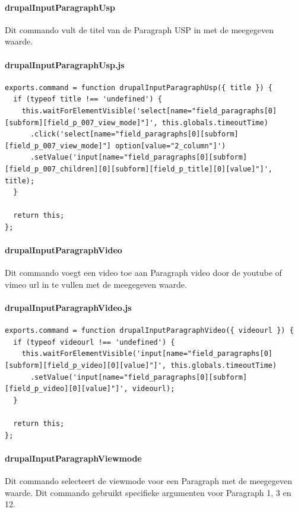 \clearpage
\paragraph{drupalInputParagraphUsp}
\label{commando24}
Dit commando vult de titel van de Paragraph USP in met de meegegeven waarde.
\paragraph{drupalInputParagraphUsp.js}
\begin{lstlisting}[breaklines=true]
exports.command = function drupalInputParagraphUsp({ title }) {
  if (typeof title !== 'undefined') {
    this.waitForElementVisible('select[name="field_paragraphs[0][subform][field_p_007_view_mode]"]', this.globals.timeoutTime)
      .click('select[name="field_paragraphs[0][subform][field_p_007_view_mode]"] option[value="2_column"]')
      .setValue('input[name="field_paragraphs[0][subform][field_p_007_children][0][subform][field_p_title][0][value]"]', title);
  }

  return this;
};
\end{lstlisting}


\clearpage
\paragraph{drupalInputParagraphVideo}
\label{commando25}
Dit commando voegt een video toe aan Paragraph video door de youtube of vimeo url in te vullen met de meegegeven waarde.
\paragraph{drupalInputParagraphVideo.js}
\begin{lstlisting}[breaklines=true]
exports.command = function drupalInputParagraphVideo({ videourl }) {
  if (typeof videourl !== 'undefined') {
    this.waitForElementVisible('input[name="field_paragraphs[0][subform][field_p_video][0][value]"]', this.globals.timeoutTime)
      .setValue('input[name="field_paragraphs[0][subform][field_p_video][0][value]"]', videourl);
  }

  return this;
};
\end{lstlisting}


\clearpage
\paragraph{drupalInputParagraphViewmode}
\label{commando26}
Dit commando selecteert de viewmode voor een Paragraph met de meegegeven waarde. Dit commando gebruikt specifieke argumenten voor Paragraph 1, 3 en 12.
